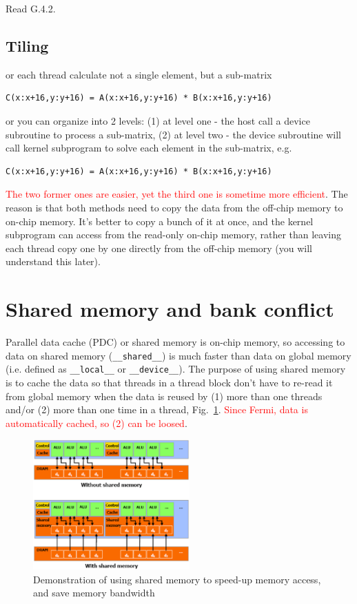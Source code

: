 Read G.4.2. 


\subsection{Tiling}
\label{sec:tiling}

or each thread calculate not a single element, but a sub-matrix
\begin{lstlisting}
C(x:x+16,y:y+16) = A(x:x+16,y:y+16) * B(x:x+16,y:y+16)
\end{lstlisting}
or you can organize into 2 levels: (1) at level one - the host call a
device subroutine to process a sub-matrix, (2) at level two - the
device subroutine will call kernel subprogram to solve each element in
the sub-matrix, e.g. 
\begin{lstlisting}
C(x:x+16,y:y+16) = A(x:x+16,y:y+16) * B(x:x+16,y:y+16)
\end{lstlisting}
\textcolor{red}{The two former ones are easier, yet the third one is
  sometime more efficient}.
The reason is that both methods need to copy the data from the
off-chip memory to on-chip memory. It's better to copy a bunch of it
at once, and the kernel subprogram can access from the read-only
on-chip memory, rather than leaving each thread copy one by one
directly from the off-chip memory (you will understand this later).

\section{Shared memory and bank conflict}
\label{sec:shared-memory-bank}

Parallel data cache (PDC) or shared memory is on-chip memory, so
accessing to data on shared memory (\verb!__shared__!) is much faster
than data on global memory (i.e. defined as \verb!__local__! or
\verb!__device__!). The purpose of using shared memory is to cache the
data so that threads in a thread block don't have to re-read it from
global memory when the data is reused by (1) more than one threads
and/or (2) more than one time in a thread,
Fig.~\ref{fig:shared_memory}.
\textcolor{red}{Since Fermi, data is automatically cached, so (2) can
  be loosed}.

\begin{figure}[hbt]
  \centerline{\includegraphics[height=5cm,
    angle=0]{./images/shared_memory.eps}}
  \caption{Demonstration of using shared memory to speed-up memory
    access, and save memory bandwidth}
  \label{fig:shared_memory}
\end{figure}


